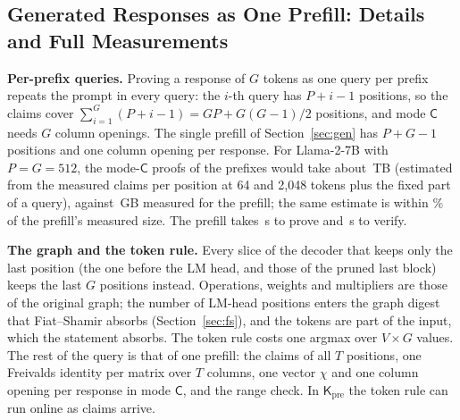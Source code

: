 \providecommand{\Kpre}{\mathsf{K}_{\mathrm{pre}}}
\providecommand{\sC}{\mathsf{C}}
\providecommand{\para}[1]{\par\noindent\textbf{#1}\quad}
\providecommand{\todo}[1]{\textbf{[TODO: #1]}}
\providecommand{\pviLoHi}[3]{\begingroup\expandafter\def\expandafter\pviLoHiA\expandafter{#1}%
  \expandafter\def\expandafter\pviLoHiB\expandafter{#2}\def\pviLoHiE{}%
  \ifx\pviLoHiA\pviLoHiB#1\else\ifx\pviLoHiB\pviLoHiE#1\else#1#3#2\fi\fi\endgroup}

\subsection{Generated Responses as One Prefill: Details and Full Measurements}
\label{sec:ext-gen}

\para{Per-prefix queries.} Proving a response of $G$ tokens as one query per prefix repeats the
prompt in every query: the $i$-th query has $P+i-1$ positions, so the claims cover
$\sum_{i=1}^{G}(P+i-1)=GP+G(G-1)/2$ positions, and mode $\sC$ needs $G$ column openings. The single
prefill of Section~\ref{sec:gen} has $P+G-1$ positions and one column opening per response. For
Llama-2-7B with $P=G=512$, the mode-$\sC$ proofs of the prefixes would take about \GenPerPrefixTB{}\,TB
(estimated from the measured claims per position at 64 and 2{,}048 tokens plus the fixed part of a
query), against \GenPrefillGB{}\,GB measured for the prefill; the same estimate is within
\GenPrefillModelWithin{}\% of the prefill's measured size. The prefill takes \GenPrefillProveC{}\,s to
prove and \GenPrefillVerifyC{}\,s to verify.

\para{The graph and the token rule.} Every slice of the decoder that keeps only the last position
(the one before the LM head, and those of the pruned last block) keeps the last $G$ positions
instead. Operations, weights and multipliers are those of the original graph; the number of LM-head
positions enters the graph digest that Fiat--Shamir absorbs (Section~\ref{sec:fs}), and the tokens
are part of the input, which the statement absorbs. The token rule costs one argmax over $V\times G$ values.
The rest of the query is that of one prefill: the claims of all $T$ positions, one Freivalds
identity per matrix over $T$ columns, one vector $\chi$ and one column opening per response in mode
$\sC$, and the range check. In $\Kpre$ the token rule can run online as claims arrive.

